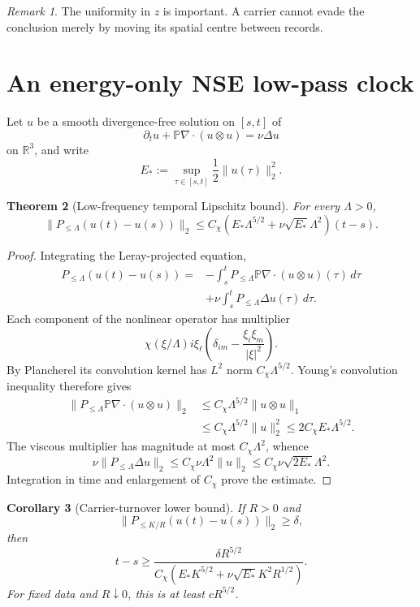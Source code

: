 \documentclass[11pt]{article}
\newtheorem{theorem}{Theorem}
\newtheorem{corollary}[theorem]{Corollary}
\theoremstyle{remark}
\newtheorem{remark}[theorem]{Remark}
\newcommand{\R}{\mathbb R}
\newcommand{\Plo}[1]{P_{\le #1}}
\begin{document}
\begin{remark}
The uniformity in \(z\) is important.  A carrier cannot evade the conclusion
merely by moving its spatial centre between records.
\end{remark}

\section{An energy-only NSE low-pass clock}

Let \(u\) be a smooth divergence-free solution on \([s,t]\) of
\[
 \partial_tu+\mathbb P\nabla\!\cdot(u\otimes u)
 =
 \nu\Delta u
\]
on \(\R^3\), and write
\[
 E_*:=\sup_{\tau\in[s,t]}\frac12\|u(\tau)\|_2^2.
\]

\begin{theorem}[Low-frequency temporal Lipschitz bound]
\label{thm:lowpass}
For every \(\Lambda>0\),
\[
 \boxed{
 \|\Plo{\Lambda}(u(t)-u(s))\|_2
 \le
 C_\chi
 \left(
 E_*\Lambda^{5/2}
 +
 \nu\sqrt{E_*}\Lambda^2
 \right)(t-s).
 }
\]
\end{theorem}

\begin{proof}
Integrating the Leray-projected equation,
\[
\begin{aligned}
 \Plo{\Lambda}(u(t)-u(s))
 ={}&
 -\int_s^t
 \Plo{\Lambda}\mathbb P\nabla\!\cdot(u\otimes u)(\tau)\,d\tau\\
 &+
 \nu\int_s^t\Plo{\Lambda}\Delta u(\tau)\,d\tau.
\end{aligned}
\]
Each component of the nonlinear operator has multiplier
\[
 \chi(\xi/\Lambda)i\xi_\ell
 \left(\delta_{im}-\frac{\xi_i\xi_m}{|\xi|^2}\right).
\]
By Plancherel its convolution kernel has \(L^2\) norm
\(C_\chi\Lambda^{5/2}\).  Young's convolution inequality therefore gives
\[
\begin{aligned}
 \|\Plo{\Lambda}\mathbb P\nabla\!\cdot(u\otimes u)\|_2
 &\le
 C_\chi\Lambda^{5/2}\|u\otimes u\|_1\\
 &\le
 C_\chi\Lambda^{5/2}\|u\|_2^2
 \le
 2C_\chi E_*\Lambda^{5/2}.
\end{aligned}
\]
The viscous multiplier has magnitude at most \(C_\chi\Lambda^2\), whence
\[
 \nu\|\Plo{\Lambda}\Delta u\|_2
 \le
 C_\chi\nu\Lambda^2\|u\|_2
 \le
 C_\chi\nu\sqrt{2E_*}\Lambda^2.
\]
Integration in time and enlargement of \(C_\chi\) prove the estimate.
\end{proof}

\begin{corollary}[Carrier-turnover lower bound]
\label{cor:clock}
If \(R>0\) and
\[
 \|\Plo{K/R}(u(t)-u(s))\|_2\ge\delta,
\]
then
\[
 t-s
 \ge
 \frac{\delta R^{5/2}}
 {C_\chi\left(
 E_*K^{5/2}
 +
 \nu\sqrt{E_*}K^2R^{1/2}
 \right)}.
\]
For fixed data and \(R\downarrow0\), this is at least \(cR^{5/2}\).
\end{corollary}
\end{document}
